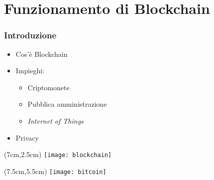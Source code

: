 \section{Funzionamento di Blockchain}
\begin{frame}
  \frametitle{Introduzione}

  \begin{itemize}
   \item<1-> Cos'è Blockchain
   \item<2-> Impieghi:
   \begin{itemize}
    \item Criptomonete
    \item Pubblica amministrazione
    \item \textit{Internet of Things}
   \end{itemize}
   \item<3-> Privacy
  \end{itemize}

 \begin{textblock*}{5cm}(7cm,2.5cm)
  \texttt{[image: blockchain]}
 \end{textblock*}

 \begin{textblock*}{5cm}(7.5cm,5.5cm)
  \texttt{[image: bitcoin]}
 \end{textblock*}


\end{frame}
